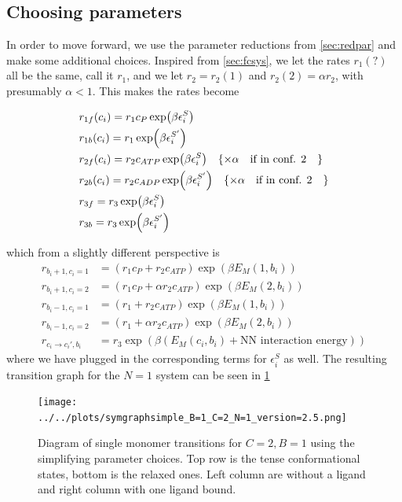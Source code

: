 \documentclass[11pt]{article}
\begin{document}
\subsection{Choosing parameters}
In order to move forward, we use the parameter reductions from \cref{sec:redpar} and make some additional choices.
Inspired from \cref{sec:fcsys}, we let the rates $r_1(?)$ all be the same, call it $r_1$, and we let $r_2=r_2(1)$ and $r_2(2)=\alpha r_2$, with presumably $\alpha < 1$.
This makes the rates become
\begin{tcolorbox}
    \begin{align}
        &r_{1f}(c_i) = r_1c_P\exp(\beta\epsilon_i^S) \label{eq:rate1f} \\
        &r_{1b}(c_i) = r_1\exp(\beta\epsilon_i^{S'}) \label{eq:rate1b} \\
        &r_{2f}(c_i) = r_2c_{ATP}\exp(\beta\epsilon_i^S) \quad \{\times \alpha \qq{if in conf. 2}\} \label{eq:rate2f} \\
        &r_{2b}(c_i) = r_2c_{ADP}\exp(\beta\epsilon_i^{S'}) \quad \{\times \alpha \qq{if in conf. 2}\} \label{eq:rate2b} \\
        &r_{3f} = r_3\exp(\beta\epsilon_i^S) \label{eq:rate3f} \\
        &r_{3b} = r_3\exp(\beta\epsilon_i^{S'}) \label{eq:rate3b}
    \end{align}
\end{tcolorbox}
which from a slightly different perspective is
\begin{align}
    r_{b_i+1,c_i=1} &= (r_1c_P+r_2c_{ATP})\exp(\beta E_M(1, b_i)) \\
    r_{b_i+1,c_i=2} &= (r_1c_P+\alpha r_2c_{ATP})\exp(\beta E_M(2, b_i)) \\
    r_{b_i-1,c_i=1} &= (r_1+r_2c_{ATP})\exp(\beta E_M(1, b_i)) \\
    r_{b_i-1,c_i=2} &= (r_1+\alpha r_2c_{ATP})\exp(\beta E_M(2, b_i)) \\
    r_{c_i \rightarrow c_i',b_i} &= r_3\exp(\beta (E_M(c_i, b_i) + \text{NN interaction energy}))
\end{align}
where we have plugged in the corresponding terms for $\epsilon_i^S$ as well.
The resulting transition graph for the $N=1$ system can be seen in \cref{fig:4sTss}

\begin{figure}[h]
    \texttt{[image: ../../plots/symgraphsimple\_B=1\_C=2\_N=1\_version=2.5.png]}
    \caption{
        Diagram of single monomer transitions for $C=2,B=1$ using the simplifying parameter choices.
        Top row is the tense conformational states, bottom is the relaxed ones.
        Left column are without a ligand and right column with one ligand bound.
    }\label{fig:4sTss}
\end{figure}
\end{document}

